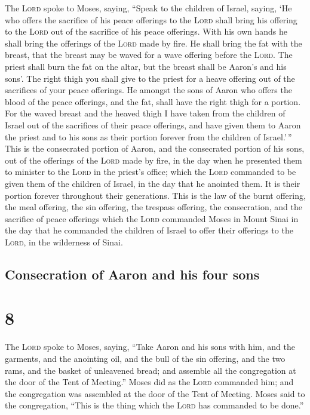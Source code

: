  The \textsc{Lord} spoke to Moses, saying,
 ``Speak to the children of Israel, saying, `He who
offers the sacrifice of his peace offerings to the \textsc{Lord} shall
bring his offering to the \textsc{Lord} out of the sacrifice of his
peace offerings.  With his own hands he shall bring the
offerings of the \textsc{Lord} made by fire. He shall bring the fat with
the breast, that the breast may be waved for a wave offering before the
\textsc{Lord}.  The priest shall burn the fat on the
altar, but the breast shall be Aaron's and his sons'. 
The right thigh you shall give to the priest for a heave offering out of
the sacrifices of your peace offerings.  He amongst the
sons of Aaron who offers the blood of the peace offerings, and the fat,
shall have the right thigh for a portion.  For the waved
breast and the heaved thigh I have taken from the children of Israel out
of the sacrifices of their peace offerings, and have given them to Aaron
the priest and to his sons as their portion forever from the children of
Israel.'\,''  This is the consecrated portion of Aaron,
and the consecrated portion of his sons, out of the offerings of the
\textsc{Lord} made by fire, in the day when he presented them to
minister to the \textsc{Lord} in the priest's office; 
which the \textsc{Lord} commanded to be given them of the children of
Israel, in the day that he anointed them. It is their portion forever
throughout their generations.  This is the law of the
burnt offering, the meal offering, the sin offering, the trespass
offering, the consecration, and the sacrifice of peace offerings
 which the \textsc{Lord} commanded Moses in Mount Sinai
in the day that he commanded the children of Israel to offer their
offerings to the \textsc{Lord}, in the wilderness of Sinai.

\hypertarget{consecration-of-aaron-and-his-four-sons}{%
\subsection{Consecration of Aaron and his four
sons}\label{consecration-of-aaron-and-his-four-sons}}

\hypertarget{section-7}{%
\section{8}\label{section-7}}

 The \textsc{Lord} spoke to Moses, saying, 
``Take Aaron and his sons with him, and the garments, and the anointing
oil, and the bull of the sin offering, and the two rams, and the basket
of unleavened bread;  and assemble all the congregation at
the door of the Tent of Meeting.''  Moses did as the
\textsc{Lord} commanded him; and the congregation was assembled at the
door of the Tent of Meeting.  Moses said to the
congregation, ``This is the thing which the \textsc{Lord} has commanded
to be done.''


